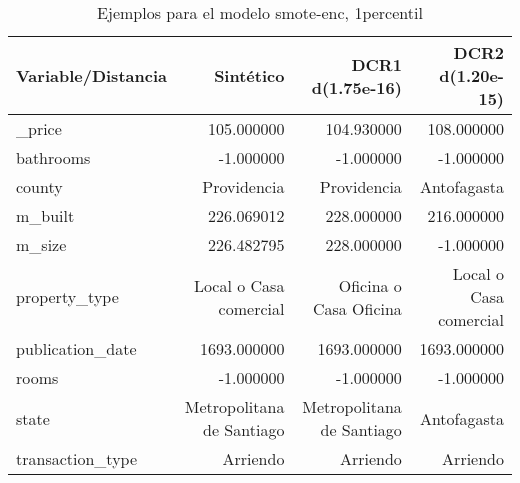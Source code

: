 \begin{table}[H]
\centering
\fontsize{10}{14}\selectfont
\caption{Ejemplos para el modelo smote-enc, 1percentil}
\label{table-example-economicos-b-2-smote-enc-1p}
\begin{tabular}{|l|r|r|r|}
\hline
\rowcolor[gray]{0.8}
Variable/Distancia & Sintético & DCR1 d(1.75e-16) & DCR2 d(1.20e-15) \\
\hline \_price & \cellcolor[rgb]{0.9, 0.54, 0.52} 105.000000 & 104.930000 & 108.000000 \\
\hline bathrooms & \cellcolor[rgb]{0.9, 0.54, 0.52} -1.000000 & \cellcolor[rgb]{0.9, 0.54, 0.52} -1.000000 & \cellcolor[rgb]{0.9, 0.54, 0.52} -1.000000 \\
\hline county & \cellcolor[rgb]{0.9, 0.54, 0.52} Providencia & \cellcolor[rgb]{0.9, 0.54, 0.52} Providencia & Antofagasta \\
\hline m\_built & \cellcolor[rgb]{0.9, 0.54, 0.52} 226.069012 & 228.000000 & 216.000000 \\
\hline m\_size & \cellcolor[rgb]{0.9, 0.54, 0.52} 226.482795 & 228.000000 & -1.000000 \\
\hline property\_type & \cellcolor[rgb]{0.9, 0.54, 0.52} Local o Casa comercial & Oficina o Casa Oficina & \cellcolor[rgb]{0.9, 0.54, 0.52} Local o Casa comercial \\
\hline publication\_date & \cellcolor[rgb]{0.9, 0.54, 0.52} 1693.000000 & \cellcolor[rgb]{0.9, 0.54, 0.52} 1693.000000 & \cellcolor[rgb]{0.9, 0.54, 0.52} 1693.000000 \\
\hline rooms & \cellcolor[rgb]{0.9, 0.54, 0.52} -1.000000 & \cellcolor[rgb]{0.9, 0.54, 0.52} -1.000000 & \cellcolor[rgb]{0.9, 0.54, 0.52} -1.000000 \\
\hline state & \cellcolor[rgb]{0.9, 0.54, 0.52} Metropolitana de Santiago & \cellcolor[rgb]{0.9, 0.54, 0.52} Metropolitana de Santiago & Antofagasta \\
\hline transaction\_type & \cellcolor[rgb]{0.9, 0.54, 0.52} Arriendo & \cellcolor[rgb]{0.9, 0.54, 0.52} Arriendo & \cellcolor[rgb]{0.9, 0.54, 0.52} Arriendo \\
\hline
\end{tabular}
\end{table}
